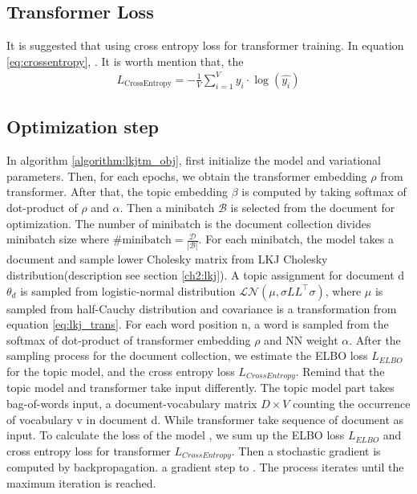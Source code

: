 \subsection{Transformer Loss}
It is suggested that using cross entropy loss for transformer training. In equation \ref{eq:crossentropy}, . It is worth mention that, the 
\begin{align}\label{eq:crossentropy}
L_{\text{CrossEntropy}}=-\frac{1}{V}\sum_{i=1}^{V}y_i\cdot\log(\hat{y_i})
\end{align}
\subsection{Optimization step}\label{ch4:3}
In algorithm \ref{algorithm:lkjtm_obj}, first initialize the model and variational parameters. Then, for each epochs, we obtain the transformer embedding $ \rho $ from transformer. After that, the topic embedding $ \beta $ is computed by taking softmax of dot-product of $ \rho $ and $ \alpha $. Then a minibatch $ \mathcal{B} $ is selected from the document for optimization. The number of minibatch is the document collection divides minibatch size where $ \#\text{minibatch}=\frac{\mathcal{D}}{|\mathcal{B}|} $. For each minibatch, the model takes a document and sample lower Cholesky matrix from LKJ Cholesky distribution(description see section \ref{ch2:lkj}). A topic assignment for document d $ \theta_d $ is sampled from logistic-normal distribution $ \mathcal{LN}(\mu,\sigma LL^\top\sigma) $, where $ \mu $ is sampled from half-Cauchy distribution and covariance is a transformation from equation \ref{eq:lkj_trans}. For each word position n, a word is sampled from the softmax of dot-product of transformer embedding $ \rho $ and NN weight $ \alpha $. After the sampling process for the document collection, we estimate the ELBO loss $ L_{ELBO} $ for the topic model, and the cross entropy loss $ L_{CrossEntropy} $. Remind that the topic model and transformer take input differently. The topic model part takes bag-of-words input, a document-vocabulary matrix $ D\times V $ counting the occurrence of vocabulary v in document d. While transformer take sequence of document as input. 
To calculate the loss of the model , we sum up the ELBO loss $ L_{ELBO} $ and cross entropy loss for transformer $ L_{CrossEntropy} $. Then a stochastic gradient is computed by backpropagation. a gradient step to . The process iterates until the maximum iteration is reached. 
\\
